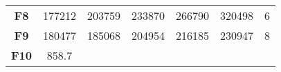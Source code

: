 \documentclass[12pt,a4paper]{article}
\begin{document}
\begin{longtable}[c]{@{}ccccccc@{}}
\begin{minipage}[t]{0.11\columnwidth}\centering\strut
\textbf{F8}
\strut\end{minipage} &
\begin{minipage}[t]{0.08\columnwidth}\centering\strut
177212
\strut\end{minipage} &
\begin{minipage}[t]{0.08\columnwidth}\centering\strut
203759
\strut\end{minipage} &
\begin{minipage}[t]{0.09\columnwidth}\centering\strut
233870
\strut\end{minipage} &
\begin{minipage}[t]{0.10\columnwidth}\centering\strut
266790
\strut\end{minipage} &
\begin{minipage}[t]{0.11\columnwidth}\centering\strut
320498
\strut\end{minipage} &
\begin{minipage}[t]{0.07\columnwidth}\centering\strut
6
\strut\end{minipage}\tabularnewline
\begin{minipage}[t]{0.11\columnwidth}\centering\strut
\textbf{F9}
\strut\end{minipage} &
\begin{minipage}[t]{0.08\columnwidth}\centering\strut
180477
\strut\end{minipage} &
\begin{minipage}[t]{0.08\columnwidth}\centering\strut
185068
\strut\end{minipage} &
\begin{minipage}[t]{0.09\columnwidth}\centering\strut
204954
\strut\end{minipage} &
\begin{minipage}[t]{0.10\columnwidth}\centering\strut
216185
\strut\end{minipage} &
\begin{minipage}[t]{0.11\columnwidth}\centering\strut
230947
\strut\end{minipage} &
\begin{minipage}[t]{0.07\columnwidth}\centering\strut
8
\strut\end{minipage}\tabularnewline
\begin{minipage}[t]{0.11\columnwidth}\centering\strut
\textbf{F10}
\strut\end{minipage} &
\begin{minipage}[t]{0.08\columnwidth}\centering\strut
858.7
\strut\end{minipage} &

\end{longtable}
\end{document}
